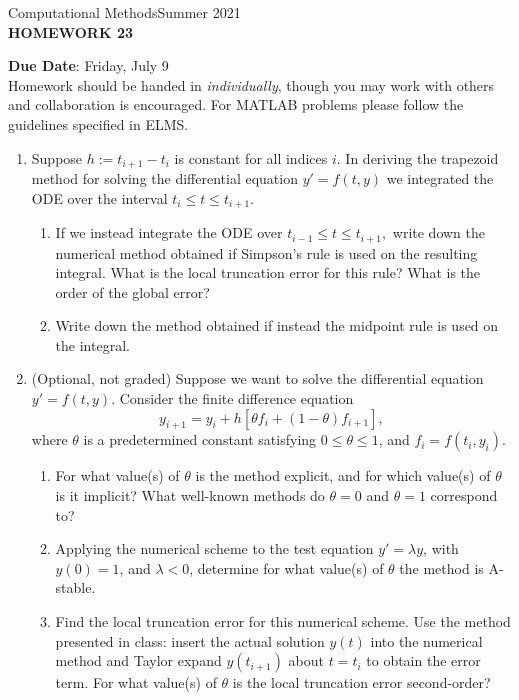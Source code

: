 \documentclass[12pt]{article}
\begin{document}
\begin{center}
Computational Methods\qquad Summer 2021
\\

\textbf{\large HOMEWORK 23}\\
\end{center}
\noindent \textbf{Due Date}: Friday, July 9\\

\noindent Homework should be handed in \emph{individually}, though you may work with others and collaboration is encouraged. For MATLAB problems please follow the guidelines specified in ELMS.

\begin{enumerate}
\item Suppose $h := t_{i+1}-t_i$ is constant for all indices $i$. In deriving the trapezoid method for solving the differential equation $y'=f(t,y)$ we integrated the ODE over the interval $t_i\le t\le t_{i+1}$.
	\begin{enumerate}
		\item If we instead integrate the ODE over $t_{i-1}\le t\le t_{i+1},$ write down the numerical method obtained if Simpson’s rule is used on the resulting integral. What is the local truncation error for this rule? What is the order of the global error?
		\item Write down the method obtained if instead the midpoint rule is used on the integral.
    \end{enumerate}
\item (Optional, not graded) 
Suppose we want to solve the differential equation $y'=f(t,y)$. Consider the finite difference equation
	\[y_{i+1}=y_i + h[\theta f_i + (1-\theta)f_{i+1}],\]
where $\theta$ is a predetermined constant satisfying $0\le \theta\le 1$, and $f_i = f(t_i,y_i)$.
	\begin{enumerate}
	\item For what value(s) of $\theta$ is the method explicit, and for which value(s) of $\theta$ is it implicit? What well-known methods do $\theta=0$ and $\theta = 1$ correspond to?
	\item Applying the numerical scheme to the test equation $y'=\lambda y$, with $y(0)=1$, and $\lambda<0$, determine for what value(s) of $\theta$ the method is A-stable.   
	\item Find the local truncation error for this numerical scheme. Use the method presented in class: insert the actual solution $y(t)$ into the numerical method and Taylor expand $y(t_{i+1})$ about $t=t_i$ to obtain the error term. For what value(s) of $\theta$ is the local truncation error second-order?
	\end{enumerate}
\end{enumerate}
\end{document}
